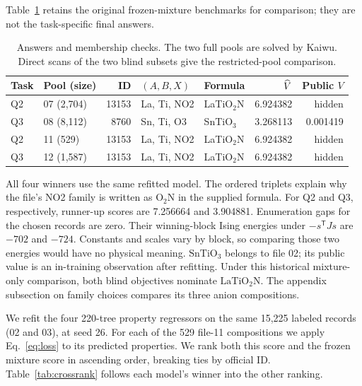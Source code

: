Table~\ref{tab:answers} retains the original frozen-mixture benchmarks for comparison; they are not the task-specific final answers.
\begin{table}[htbp]
\caption{Answers and membership checks. The two full pools are solved by Kaiwu. Direct scans of the two blind subsets give the restricted-pool comparison.}\label{tab:answers}
\centering\small\begin{tabular}{llrllrr}
\toprule Task & Pool (size) & ID & $(A,B,X)$ & Formula & $\widehat V$ & Public $V$\\\midrule
Q2 & 07 (2,704)&13153& La, Ti, NO2 & LaTiO$_2$N & 6.924382 & hidden\\
Q3 & 08 (8,112)&8760& Sn, Ti, O3 & SnTiO$_3$ & 3.268113 & 0.001419\\\midrule
Q2 & 11 (529)&13153& La, Ti, NO2 & LaTiO$_2$N & 6.924382 & hidden\\
Q3 & 12 (1,587)&13153& La, Ti, NO2 & LaTiO$_2$N & 6.924382 & hidden\\\bottomrule
\end{tabular}
\end{table}
All four winners use the same refitted model. The ordered triplets explain why the file's NO2 family is written as O$_2$N in the supplied formula. For Q2 and Q3, respectively, runner-up scores are 7.256664 and 3.904881. Enumeration gaps for the chosen records are zero. Their winning-block Ising energies under $-s^\mathsf{T}Js$ are $-702$ and $-724$. Constants and scales vary by block, so comparing those two energies would have no physical meaning. $\mathrm{SnTiO_3}$ belongs to file 02; its public value is an in-training observation after refitting. Under this historical mixture-only comparison, both blind objectives nominate $\mathrm{LaTiO_2N}$. The appendix subsection on family choices compares its three anion compositions.

We refit the four 220-tree property regressors on the same 15,225 labeled records (02 and 03), at seed 26. For each of the 529 file-11 compositions we apply Eq.~\eqref{eq:loss} to its predicted properties. We rank both this score and the frozen mixture score in ascending order, breaking ties by official ID. Table~\ref{tab:crossrank} follows each model's winner into the other ranking.

